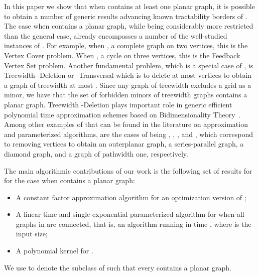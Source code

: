 In this paper we show that when   contains at least one planar graph, it is possible to obtain 
 a number of generic results advancing known tractability borders of  \fd{}. 
  The case when  contains a planar graph, while being considerably more restricted than the general case, already encompasses a number of the well-studied  
 instances of \fd{}. For  example, when , a complete graph on two
vertices, this is the {\sc Vertex Cover} problem. When , a cycle on three
vertices, this is the {\sc Feedback Vertex Set} problem. Another fundamental problem, which is a special case of  \fd{}, is 
 {\sc Treewidth -Deletion} or  {\sc
-Transversal} which is  to delete
at most  vertices to obtain a graph of treewidth at most . Since any graph of treewidth  excludes a 
 grid as a minor, we have that the set  of forbidden minors of treewidth 
 graphs contains a planar graph. 
{\sc Treewidth -Deletion}  plays important role in 
 generic efficient polynomial time approximation schemes based on Bidimensionality
Theory~\cite{FominLRS11,FominLS12}. Among other examples of   \fd{} that can be found in the literature on approximation and parameterized algorithms, are 
the cases of  being 
, , ,  and , which correspond to removing vertices to
obtain an  outerplanar graph, a series-parallel graph,  a diamond graph,   and a graph  of pathwidth one,  respectively. 


The main algorithmic contributions of our work is the following set of results for \fd{}  for the case  
when   contains a planar graph:
\begin{itemize}
\setlength{\itemsep}{-2pt}
\item A constant factor approximation algorithm   for an optimization version of \fd{};  
\item A linear time and single exponential parameterized algorithm for \fd{} when all graphs in  are connected, that is, an algorithm running in time , where  is the input size;
\item A polynomial kernel for \fd.
\end{itemize}
We use  to denote the subclass of  such that every  contains a planar graph. 









